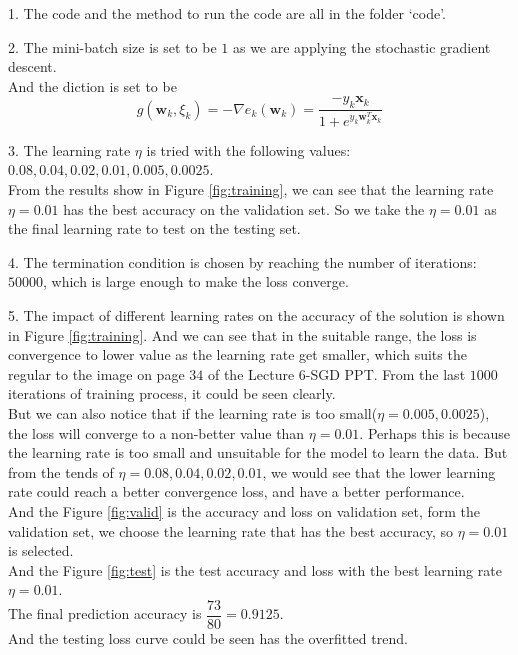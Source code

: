 \documentclass{article}
\begin{document}
1. The code and the method to run the code are all in the folder `code'.

2. The mini-batch size is set to be $1$ as we are applying the stochastic gradient descent.\\
And the diction is set to be $$g(\mathbf{w}_k,\xi_k)=-\nabla e_k(\mathbf{w}_k)=\dfrac{-y_k\mathbf{x}_k}{1+e^{y_k\mathbf{w}_k^T\mathbf{x}_k}}$$


3. The learning rate $\eta$ is tried with the following values: $0.08, 0.04, 0.02, 0.01, 0.005, 0.0025$.\\
From the results show in Figure \ref{fig:training}, we can see that the learning rate $\eta = 0.01$ has the best accuracy on the validation set. So we take the $\eta=0.01$ as the final learning rate to test on the testing set.

4. The termination condition is chosen by reaching the number of iterations: $50000$, which is large enough to make the loss converge.

5. The impact of different learning rates on the accuracy of the solution is shown in Figure \ref{fig:training}. And we can see that in the suitable range, the loss is convergence to lower value as the learning rate get smaller, which suits the regular to the image on page $34$ of the Lecture $6$-SGD PPT.
From the last $1000$ iterations of training process, it could be seen clearly.\\
But we can also notice that if the learning rate is too small($\eta=0.005,0.0025$), the loss will converge to a non-better value than $\eta=0.01$. Perhaps this is because the learning rate is too small and unsuitable for the model to learn the data. But from the tends of $\eta=0.08,0.04,0.02,0.01$, we would see that the lower learning rate could reach a better convergence loss, and have a better performance.\\

And the Figure \ref{fig:valid} is the accuracy and loss on validation set, form the validation set, we choose the learning rate that has the best accuracy, so $\eta=0.01$ is selected.\\

And the Figure \ref{fig:test} is the test accuracy and loss with the best learning rate $\eta=0.01$.\\
The final prediction accuracy is $\dfrac{73}{80}=0.9125$.\\
And the testing loss curve could be seen has the overfitted trend.\\
\end{document}
